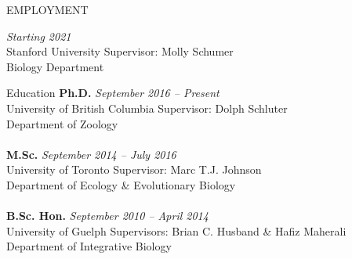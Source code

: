 \documentclass[11pt]{article}
\begin{document}





\noindent\begin{rSection}{EMPLOYMENT}
\vspace{0.5em}

 \hfill {\em Starting 2021} 
\\ Stanford University \hfill { Supervisor: Molly Schumer}
\\ Biology Department \\

\end{rSection}


\noindent\begin{rSection}{Education}
\vspace{0.5em}
\noindent
{\bf Ph.D.} \hfill {\em September 2016 -- Present} 
\\ University of British Columbia \hfill { Supervisor: Dolph Schluter}
\\ Department of Zoology \\

\noindent
\\{\bf M.Sc.} \hfill {\em September 2014 -- July 2016} 
\\ University of Toronto\hfill { Supervisor: Marc T.J. Johnson}
\\ Department of Ecology \& Evolutionary Biology \\

\noindent
\\{\bf B.Sc. Hon.} \hfill {\em September 2010 -- April 2014} 
\\ University of Guelph\hfill { Supervisors: Brian C. Husband \& Hafiz Maherali}
\\ Department of Integrative Biology \\

\end{rSection}

\end{document}
